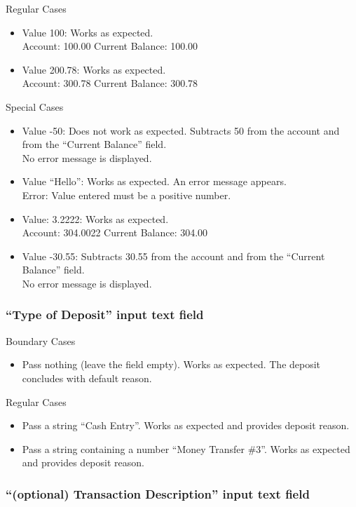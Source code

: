 \documentclass[12pt]{article}
\begin{document}
Regular Cases
\begin{itemize}
  \item Value 100: Works as expected.\\
Account: 100.00 Current Balance: 100.00
  \item Value 200.78: Works as expected.\\
Account: 300.78 Current Balance: 300.78
\end{itemize}

Special Cases
\begin{itemize}
  \item Value -50: Does not work as expected. Subtracts 50 from the account and from the ``Current Balance'' field.\\
No error message is displayed.
  \item Value ``Hello'': Works as expected. An error message appears.\\
Error: Value entered must be a positive number.
  \item Value: 3.2222: Works as expected.\\
Account: 304.0022 Current Balance: 304.00
  \item Value -30.55: Subtracts 30.55 from the account and from the ``Current Balance'' field.\\
No error message is displayed.
\end{itemize}

\subsubsection{``Type of Deposit'' input text field}

Boundary Cases
\begin{itemize}
  \item Pass nothing (leave the field empty). Works as expected. The deposit concludes with default reason.
\end{itemize}

Regular Cases
\begin{itemize}
  \item Pass a string  ``Cash Entry''. Works as expected and provides deposit reason.
  \item Pass a string containing a number  ``Money Transfer \#3''. Works as expected and provides deposit reason.
\end{itemize}

\subsubsection{``(optional) Transaction Description'' input text field}
\end{document}
